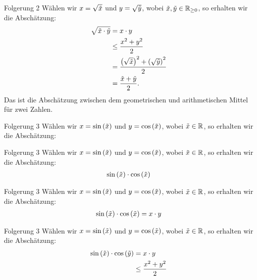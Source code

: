 \documentclass[10pt]{beamer}
\def\bR{\mathbb{R}}
\begin{document}
\begin{frame}{Folgerung 2}
    Wählen wir \( x = \sqrt{\Tilde{x}} \) und \( y = \sqrt{\Tilde{y}} \), wobei \( \Tilde{x}, \Tilde{y} \in \bR_{\geq 0} \), so erhalten wir die Abschätzung:
    \begin{align*}
        \sqrt{\Tilde{x} \cdot \Tilde{y}}
        & = x \cdot y \\
        & \leq \frac{x^{2} + y^{2}}{2} \\
        & = \frac{\left( \sqrt{\Tilde{x}} \right)^{2} + \left( \sqrt{\Tilde{y}} \right)^{2}}{2} \\
        & = \frac{\Tilde{x} + \Tilde{y}}{2}.
    \end{align*}
    Das ist die Abschätzung zwischen dem geometrischen und arithmetischen Mittel für zwei Zahlen.
\end{frame}



\begin{frame}{Folgerung 3}
    Wählen wir \( x = \sin\left( \Tilde{x} \right) \) und \( y = \cos\left( \Tilde{x} \right) \), wobei \( \Tilde{x} \in \bR \), so erhalten wir die Abschätzung: 
\end{frame}



\begin{frame}{Folgerung 3}
    Wählen wir \( x = \sin\left( \Tilde{x} \right) \) und \( y = \cos\left( \Tilde{x} \right) \), wobei \( \Tilde{x} \in \bR \), so erhalten wir die Abschätzung:
    \begin{align*}
        \sin\left( \Tilde{x} \right) \cdot \cos\left( \Tilde{x} \right)
    \end{align*}
\end{frame}



\begin{frame}{Folgerung 3}
    Wählen wir \( x = \sin\left( \Tilde{x} \right) \) und \( y = \cos\left( \Tilde{x} \right) \), wobei \( \Tilde{x} \in \bR \), so erhalten wir die Abschätzung:
    \begin{align*}
        \sin\left( \Tilde{x} \right) \cdot \cos\left( \Tilde{x} \right)
        & = x \cdot y \\
    \end{align*}
\end{frame}



\begin{frame}{Folgerung 3}
    Wählen wir \( x = \sin\left( \Tilde{x} \right) \) und \( y = \cos\left( \Tilde{x} \right) \), wobei \( \Tilde{x} \in \bR \), so erhalten wir die Abschätzung:
    \begin{align*}
        \sin\left( \Tilde{x} \right) \cdot \cos\left( \Tilde{y} \right)
        & = x \cdot y \\
        & \leq \frac{x^{2} + y^{2}}{2} \\
    \end{align*}
\end{frame}
\end{document}
